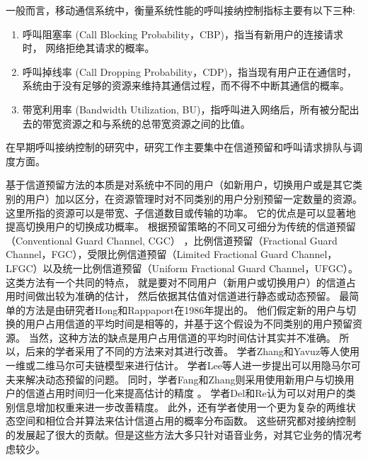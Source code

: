 一般而言，移动通信系统中，衡量系统性能的呼叫接纳控制指标主要有以下三种:
\begin{enumerate}[(1)]
\item 呼叫阻塞率  (Call Blocking Probability，CBP)，指当有新用户的连接请求时， 网络拒绝其请求的概率。
\item 呼叫掉线率  (Call Dropping Probability，CDP)，指当现有用户正在通信时，系统由于没有足够的资源来维持其通信过程，而不得不中断其通信的概率。
\item 带宽利用率 (Bandwidth Utilization, BU)，指呼叫进入网络后，所有被分配出去的带宽资源之和与系统的总带宽资源之间的比值。
\end{enumerate}

在早期呼叫接纳控制的研究中，研究工作主要集中在信道预留和呼叫请求排队与调度方面。

基于信道预留方法的本质是对系统中不同的用户（如新用户，切换用户或是其它类别的用户）加以区分，在资源管理时对不同类别的用户分别预留一定数量的资源。
这里所指的资源可以是带宽、子信道数目或传输的功率。
它的优点是可以显著地提高切换用户的切换成功概率。
根据预留策略的不同又可细分为传统的信道预留（Conventional Guard Channel, CGC）
\cite{Hong:1986}\cite{Lunayach:1982}\cite{Posner:1985}，比例信道预留（Fractional Guard Channel，FGC）\cite{Ramjee:1997}\cite{Y-G-Fang.TVT.2002}\cite{Vazquez:2006}，受限比例信道预留（Limited Fractional Guard Channel，LFGC）\cite{CruzPerez:1999}以及统一比例信道预留（Uniform Fractional Guard Channel，UFGC）\cite{Beigy:2004}。
这类方法有一个共同的特点，
就是要对不同用户（新用户或切换用户）的信道占用时间做出较为准确的估计，
然后依据其估值对信道进行静态或动态预留。
最简单的方法是由研究者Hong和Rappaport在1986年提出的\cite{Hong:1986}。
他们假定新的用户与切换的用户占用信道的平均时间是相等的，并基于这个假设为不同类别的用户预留资源。
当然，这种方法的缺点是用户占用信道的平均时间估计其实并不准确。 所以，后来的学者采用了不同的方法来对其进行改善。
学者Zhang和Yavuz等人使用一维或二维马尔可夫链模型来进行估计\cite{Zhang:2003}\cite{Yavuz:2006}\cite{Sindal:2008}。
学者Lee等人进一步提出可以用隐马尔可夫来解决动态预留的问题\cite{LeeWu2006}。
同时，学者Fang和Zhang则采用使用新用户与切换用户的信道占用时间归一化来提高估计的精度 \cite{Y-G-Fang.TVT.2002}。
学者Del和Re认为可以对用户的类别信息增加权重来进一步改善精度\cite{Del1995}。
此外，还有学者使用一个更为复杂的两维状态空间和相位合并算法来估计信道占用的概率分布函数\cite{Melikov:2006}。
这些研究都对接纳控制的发展起了很大的贡献。但是这些方法大多只针对语音业务，对其它业务的情况考虑较少。

